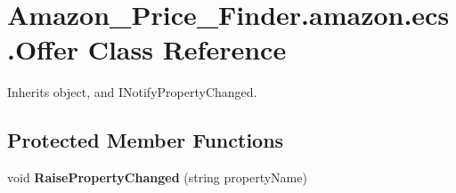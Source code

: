\hypertarget{class_amazon___price___finder_1_1amazon_1_1ecs_1_1_offer}{\section{Amazon\-\_\-\-Price\-\_\-\-Finder.\-amazon.\-ecs.\-Offer Class Reference}
\label{class_amazon___price___finder_1_1amazon_1_1ecs_1_1_offer}
}


 




Inherits object, and I\-Notify\-Property\-Changed.

\subsection*{Protected Member Functions}
\begin{DoxyCompactItemize}
\item 
\hypertarget{class_amazon___price___finder_1_1amazon_1_1ecs_1_1_offer_a766288296b1853d26fb17e57d97ea8c0}{void {\bfseries Raise\-Property\-Changed} (string property\-Name)}\label{class_amazon___price___finder_1_1amazon_1_1ecs_1_1_offer_a766288296b1853d26fb17e57d97ea8c0}

\end{DoxyCompactItemize}
